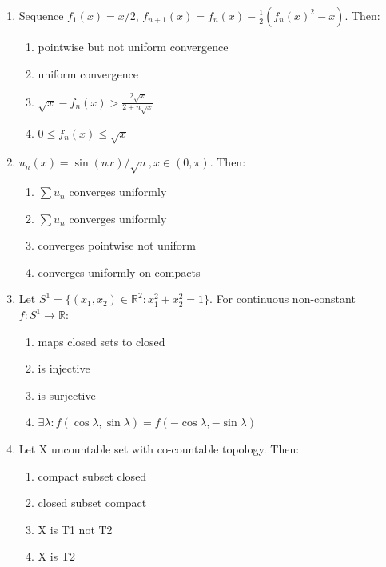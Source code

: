 \documentclass[journal,12pt,onecolumn]{IEEEtran}
\theoremstyle{remark}
\begin{document}
\begin{enumerate}
\item Sequence $f_1(x)=x/2$, $f_{n+1}(x)=f_n(x)-\tfrac12(f_n(x)^2-x)$. Then:  

\begin{enumerate}
\item pointwise but not uniform convergence
\item uniform convergence
\item $\sqrt{x}-f_n(x)> \tfrac{2\sqrt{x}}{2+n\sqrt{x}}$
\item $0\le f_n(x)\le \sqrt{x}$
\end{enumerate}
\hfill{}

\item $u_n(x)=\sin(nx)/\sqrt{n}, x\in(0,\pi)$. Then:  

\begin{enumerate}
\item $\sum u_n$ converges uniformly
\item $\sum u_n$ converges uniformly
\item converges pointwise not uniform
\item converges uniformly on compacts
\end{enumerate}
\hfill{}

\item Let $S^1=\{(x_1,x_2)\in\mathbb{R}^2:x_1^2+x_2^2=1\}$. For continuous non-constant $f:S^1\to\mathbb{R}$:  

\begin{enumerate}
\item maps closed sets to closed
\item is injective
\item is surjective
\item $\exists \lambda: f(\cos\lambda,\sin\lambda)=f(-\cos\lambda,-\sin\lambda)$
\end{enumerate}
\hfill{}

\item Let X uncountable set with co-countable topology. Then:  

\begin{enumerate}
\item compact subset closed
\item closed subset compact
\item X is T1 not T2
\item X is T2
\end{enumerate}
\hfill{}


\end{enumerate}
\end{document}
